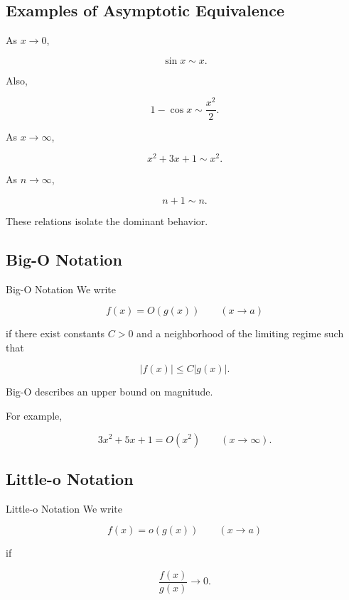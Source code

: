 \subsection{Examples of Asymptotic Equivalence}
\label{subsec:asymptotic-equivalence-examples}

As \(x\to0\),

\[
\boxed{
\sin x\sim x.
}
\]

Also,

\[
\boxed{
1-\cos x\sim\frac{x^2}{2}.
}
\]

As \(x\to\infty\),

\[
\boxed{
x^2+3x+1\sim x^2.
}
\]

As \(n\to\infty\),

\[
\boxed{
n+1\sim n.
}
\]

These relations isolate the dominant behavior.

\subsection{Big-O Notation}
\label{subsec:asymptotic-big-o}

\begin{definitionbox}{Big-O Notation}
We write

\[
\boxed{
f(x)=O(g(x))
\qquad
(x\to a)
}
\]

if there exist constants \(C>0\) and a neighborhood of the limiting
regime such that

\[
\boxed{
|f(x)|
\leq
C|g(x)|.
}
\]
\end{definitionbox}

Big-O describes an upper bound on magnitude.

For example,

\[
\boxed{
3x^2+5x+1
=
O(x^2)
\qquad
(x\to\infty).
}
\]

\subsection{Little-o Notation}
\label{subsec:asymptotic-little-o}

\begin{definitionbox}{Little-o Notation}
We write

\[
\boxed{
f(x)=o(g(x))
\qquad
(x\to a)
}
\]

if

\[
\boxed{
\frac{f(x)}{g(x)}
\to0.
}
\]
\end{definitionbox}

